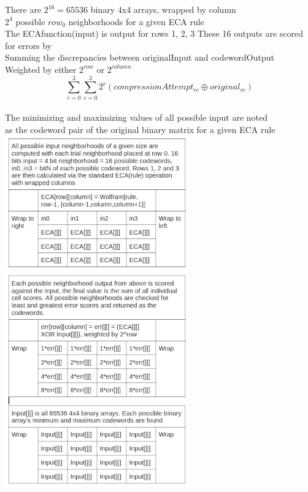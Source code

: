 \documentclass[11pt]{article}
\begin{document}
\begin{center}
There are $2^{16}=65536$ binary 4x4 arrays, wrapped by column\\
$2^4$ possible $row_0$ neighborhoods for a given ECA rule\\
The ECAfunction(input) is output for rows 1, 2, 3
These 16 outputs are scored for errors by\\
Summing the discrepancies between originalInput and codewordOutput\\
Weighted by either $2^{row}$ or $2^{column}$\\
\[  \sum_{r=0}^{3} \sum_{c=0}^{3} 2^r ( compressionAttempt_{r c} \oplus original_{r c}) \]\\
 The minimizing and maximizing values of all possible input are noted\\
 as the codeword pair of the original binary matrix for a given ECA rule\\
\includegraphics{fourByfour}
\end{center}
\end{document}

